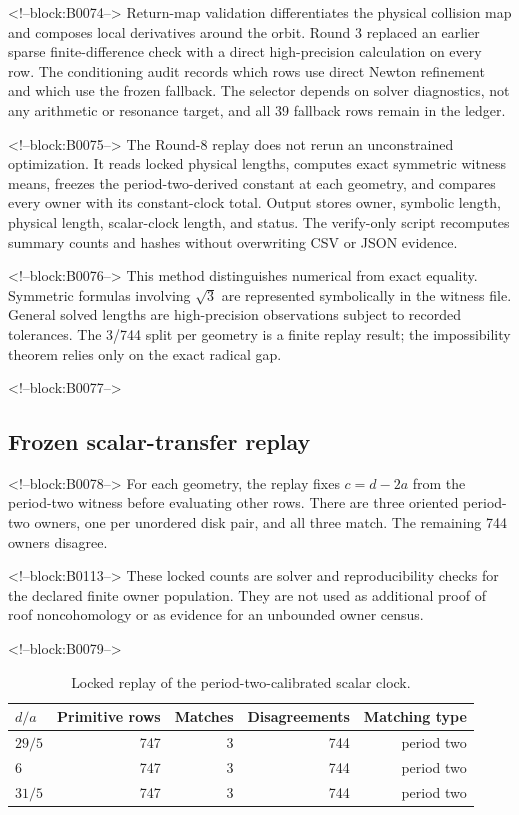 \documentclass[11pt,a4paper]{article}
\theoremstyle{definition}
\theoremstyle{remark}
\begin{document}
<!--block:B0074-->
Return-map validation differentiates the physical collision map and composes local derivatives around the orbit. Round 3 replaced an earlier sparse finite-difference check with a direct high-precision calculation on every row. The conditioning audit records which rows use direct Newton refinement and which use the frozen fallback. The selector depends on solver diagnostics, not any arithmetic or resonance target, and all 39 fallback rows remain in the ledger.

<!--block:B0075-->
The Round-8 replay does not rerun an unconstrained optimization. It reads locked physical lengths, computes exact symmetric witness means, freezes the period-two-derived constant at each geometry, and compares every owner with its constant-clock total. Output stores owner, symbolic length, physical length, scalar-clock length, and status. The verify-only script recomputes summary counts and hashes without overwriting CSV or JSON evidence.

<!--block:B0076-->
This method distinguishes numerical from exact equality. Symmetric formulas involving \(\sqrt3\) are represented symbolically in the witness file. General solved lengths are high-precision observations subject to recorded tolerances. The 3/744 split per geometry is a finite replay result; the impossibility theorem relies only on the exact radical gap.

<!--block:B0077-->
\subsection{Frozen scalar-transfer replay}

<!--block:B0078-->
For each geometry, the replay fixes \(c=d-2a\) from the period-two witness before evaluating other rows. There are three oriented period-two owners, one per unordered disk pair, and all three match. The remaining 744 owners disagree.

<!--block:B0113-->
These locked counts are solver and reproducibility checks for the declared finite owner population. They are not used as additional proof of roof noncohomology or as evidence for an unbounded owner census.

<!--block:B0079-->
\begin{table}[t]
\centering
\caption{Locked replay of the period-two-calibrated scalar clock.}
\label{tab:replay}
\begin{tabular}{lrrrr}
\toprule
\(d/a\) & Primitive rows & Matches & Disagreements & Matching type \\
\midrule
\(29/5\) & 747 & 3 & 744 & period two \\
\(6\) & 747 & 3 & 744 & period two \\
\(31/5\) & 747 & 3 & 744 & period two \\
\bottomrule
\end{tabular}
\end{table}
\end{document}
